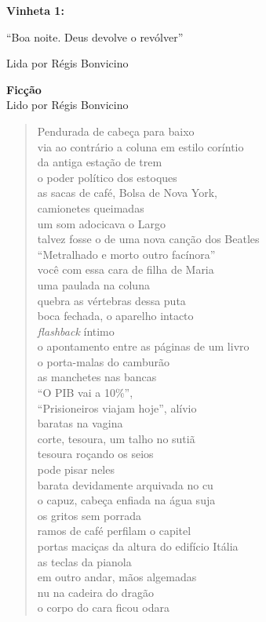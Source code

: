 \pagebreak

\textbf{Vinheta 1:}

``Boa noite. Deus devolve o revólver''

Lida por Régis Bonvicino

\pagebreak

\textbf{Ficção}\\
Lido por Régis Bonvicino

\begin{verse}
Pendurada de cabeça para baixo\\
via ao contrário a coluna em estilo coríntio\\
da antiga estação de trem\\
o poder político dos estoques\\[5pt]
as sacas de café, Bolsa de Nova York,\\
camionetes queimadas\\
um som adocicava o Largo\\
talvez fosse o de uma nova canção dos Beatles\\[5pt]
``Metralhado e morto outro facínora''\\
você com essa cara de filha de Maria\\
uma paulada na coluna\\
quebra as vértebras dessa puta\\[5pt]
boca fechada, o aparelho intacto\\
\emph{flashback} íntimo\\
o apontamento entre as páginas de um livro\\
o porta-malas do camburão\\[5pt]
as manchetes nas bancas\\
``O PIB vai a 10\%'',\\
``Prisioneiros viajam hoje'', alívio\\
baratas na vagina\\[5pt]
corte, tesoura, um talho no sutiã\\
tesoura roçando os seios\\
pode pisar neles\\
barata devidamente arquivada no cu\\[5pt]
o capuz, cabeça enfiada na água suja\\
os gritos sem porrada\\
ramos de café perfilam o capitel\\
portas maciças da altura do edifício Itália\\[5pt]
as teclas da pianola\\
em outro andar, mãos algemadas\\
nu na cadeira do dragão\\
o corpo do cara ficou odara
\end{verse}

